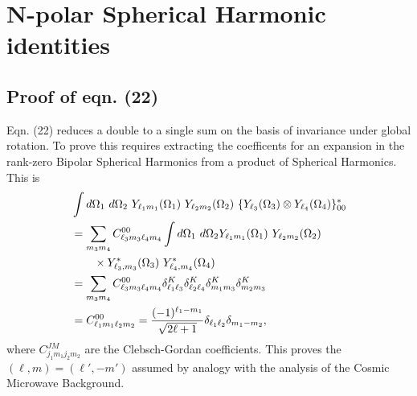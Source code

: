 \documentclass[useAMS,usenatbib]{mn2e}
\begin{document}
\section{N-polar Spherical Harmonic identities}
\subsection{Proof of eqn. (22)}
Eqn. (22) reduces a double to a single sum on the basis of invariance under global rotation.  To prove this requires extracting the coefficents for an expansion in the rank-zero Bipolar Spherical Harmonics from a product of Spherical Harmonics.  This is  
\begin{align}
&\int d \Omega_1 \ d \Omega_2 \ Y_{\ell_1 m_1}(\Omega_1) \ Y_{\ell_2 m_2}(\Omega_2) \ \{ Y_{\ell_3} (\Omega_3) \otimes Y_{\ell_4} (\Omega_4) \}_{00}^{*} \notag \\
& = \sum_{m_3 m_4} C^{00}_{\ell_3 m_3 \ell_4 m_4} \int d \Omega_1 \ d \Omega_2 Y_{\ell_1 m_1}(\Omega_1) \ Y_{\ell_2 m_2}(\Omega_2) \ \notag \\
& \qquad \times Y_{\ell_3, m_3}^{*} (\Omega_3) \ Y_{\ell_4, m_4}^{*} (\Omega_4) \notag \\
& = \sum_{m_3 m_4} C^{00}_{\ell_3 m_3 \ell_4 m_4} \delta^{K}_{\ell_1 \ell_3} 
\delta^{K}_{\ell_2 \ell_4} 
\delta^{K}_{m_1 m_3}
\delta^{K}_{m_2 m_3} \notag \\ 
& = C^{00}_{\ell_1 m_1 \ell_2 m_2} = \frac{(-1)^{\ell_1 - m_1}}{\sqrt{2 \ell + 1}} \delta_{\ell_1 \ell_2} \delta_{m_1 -m_2},
\end{align}
where $C^{JM}_{j_1 m_1 j_2 m_2}$ are the Clebsch-Gordan coefficients.  This proves the $(\ell, m) = (\ell', -m')$ assumed by analogy with the analysis of the Cosmic Microwave Background.  
\end{document}
